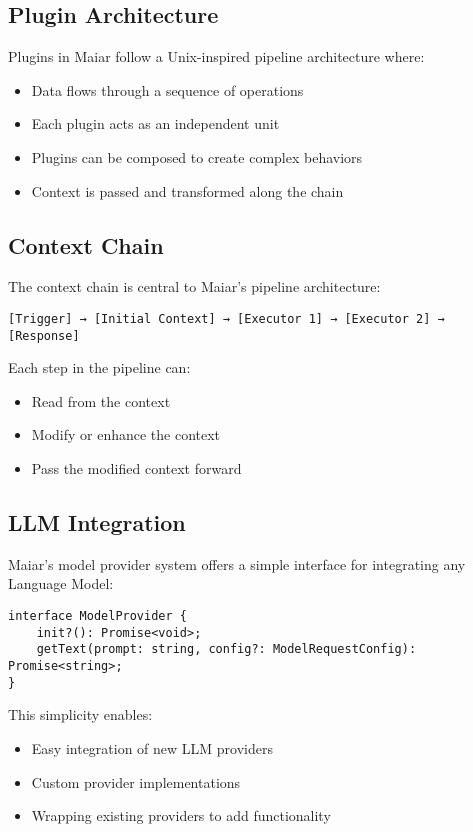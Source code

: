 \documentclass[12pt]{article}
\begin{document}
\subsection{Plugin Architecture}
Plugins in Maiar follow a Unix-inspired pipeline architecture where:

\begin{itemize}
    \item Data flows through a sequence of operations
    \item Each plugin acts as an independent unit
    \item Plugins can be composed to create complex behaviors
    \item Context is passed and transformed along the chain
\end{itemize}

\subsection{Context Chain}
The context chain is central to Maiar's pipeline architecture:

\begin{verbatim}
[Trigger] → [Initial Context] → [Executor 1] → [Executor 2] → [Response]
\end{verbatim}

Each step in the pipeline can:
\begin{itemize}
    \item Read from the context
    \item Modify or enhance the context
    \item Pass the modified context forward
\end{itemize}

\subsection{LLM Integration}
Maiar's model provider system offers a simple interface for integrating any Language Model:

\begin{verbatim}
interface ModelProvider {
    init?(): Promise<void>;
    getText(prompt: string, config?: ModelRequestConfig): Promise<string>;
}
\end{verbatim}

This simplicity enables:
\begin{itemize}
    \item Easy integration of new LLM providers
    \item Custom provider implementations
    \item Wrapping existing providers to add functionality
\end{itemize}
\end{document}
